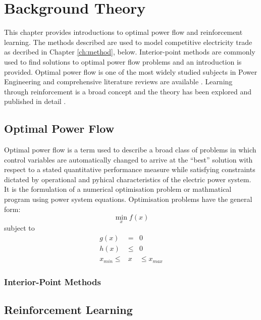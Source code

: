 \chapter{Background Theory}
\label{ch:background}
This chapter provides introductions to optimal power flow and reinforcement
learning.  The methods described are used to model competitive electricity
trade as decribed in Chapter \ref{ch:method}, below.  Interior-point methods
are commonly used to find solutions to optimal power flow problems and an
introduction is provided.  Optimal power flow is one of the most widely studied
subjects in Power Engineering and comprehensive literature reviews are
available \cite{momoh:part1,momoh:part2}.  Learning through reinforcement is a
broad concept and the theory has been explored and published in detail
\cite{suttonbarto:1998,bertsekas:96}.

\section{Optimal Power Flow}
\label{sec:opf}
Optimal power flow is a term used to describe a broad class of problems in
which control variables are automatically changed to arrive at the ``best''
solution with respect to a stated quantitative performance measure while
satisfying constraints dictated by operational and pyhical characteristics of
the electric power system.  It is the formulation of a numerical optimisation
problem or mathmatical program using power system equations.   Optimisation
problems have the general form:
\begin{equation}
\min_x f(x)
\end{equation}
subject to
\begin{eqnarray}
g(x)& =& 0\\
h(x)& \leq& 0\\
x_{min}\leq& x& \leq x_{max}
\end{eqnarray}

\subsection{Interior-Point Methods}

\section{Reinforcement Learning}
\label{sec:rl}

